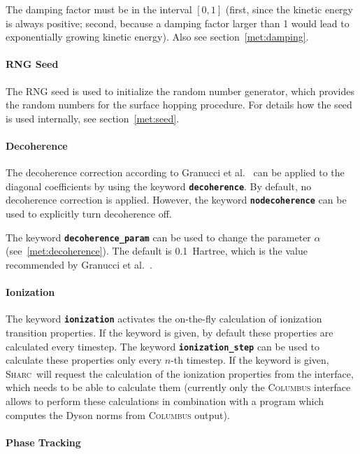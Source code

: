 \documentclass[a4paper,11pt,DIV=15,openany,twoside=false]{scrbook}
\newcommand{\sharc}{\textsc{Sharc}}
\newcommand{\ttt}[1]{\textbf{\texttt{#1}}}
\begin{document}
The damping factor must be in the interval $[0,1]$ (first, since the kinetic energy is always positive; second, because a damping factor larger than 1 would lead to exponentially growing kinetic energy). Also see section~\ref{met:damping}.

\paragraph{RNG Seed}

The RNG seed is used to initialize the random number generator, which provides the random numbers for the surface hopping procedure. For details how the seed is used internally, see section~\ref{met:seed}.

\paragraph{Decoherence}

The decoherence correction according to Granucci et al.~\cite{Granucci2010JCP} can be applied to the diagonal coefficients by using the keyword \ttt{decoherence}. By default, no decoherence correction is applied. However, the keyword \ttt{nodecoherence} can be used to explicitly turn decoherence off. 

The keyword \ttt{decoherence\_param} can be used to change the parameter $\alpha$ (see~\ref{met:decoherence}). The default is 0.1~Hartree, which is the value recommended by Granucci et al.~\cite{Granucci2010JCP}.

\paragraph{Ionization}

The keyword \ttt{ionization} activates the on-the-fly calculation of ionization transition properties. If the keyword is given, by default these properties are calculated every timestep. The keyword \ttt{ionization\_step} can be used to calculate these properties only every $n$-th timestep. 
If the keyword is given, \sharc\ will request the calculation of the ionization properties from the interface, which needs to be able to calculate them (currently only the \textsc{Columbus} interface allows to perform these calculations in combination with a program which computes the Dyson norms from \textsc{Columbus} output).

\paragraph{Phase Tracking}
\end{document}
